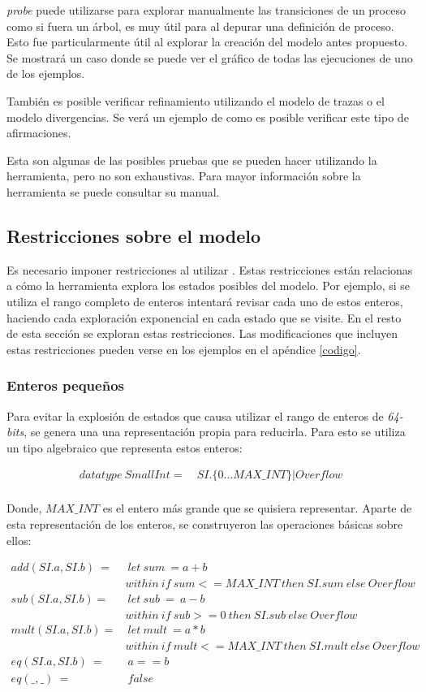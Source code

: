 \textit{probe} puede utilizarse para explorar manualmente las transiciones de un proceso como si fuera un árbol, es muy útil para al depurar una definición de proceso. Esto fue particularmente útil al explorar la creación del modelo antes propuesto. Se mostrará un caso donde se puede ver el gráfico de todas las ejecuciones de uno de los ejemplos. 
 
También es posible verificar refinamiento utilizando el modelo de trazas o el modelo divergencias. Se verá un ejemplo de como es posible verificar este tipo de afirmaciones.

Esta son algunas de las posibles pruebas que se pueden hacer utilizando la herramienta, pero no son exhaustivas. Para mayor información sobre la herramienta se puede consultar su manual\cite{fdrmanual}.

\subsection{Restricciones sobre el modelo}

Es necesario imponer restricciones al utilizar \FDR. Estas restricciones están relacionas a cómo la herramienta explora los estados posibles del modelo. Por ejemplo, si se utiliza el rango completo de enteros intentará revisar cada uno de estos enteros, haciendo cada exploración exponencial en cada estado que se visite. En el resto de esta sección se exploran estas restricciones. Las modificaciones que incluyen estas restricciones pueden verse en los ejemplos en el apéndice \ref{codigo}.

\subsubsection*{Enteros pequeños}

Para evitar la explosión de estados que causa utilizar el rango de enteros de \textit{64-bits}, se genera una una representación propia para reducirla. Para esto se utiliza un tipo algebraico que representa estos enteros:

\begin{align*}
datatype\ SmallInt =&\ SI.\{0 \ldots MAX\_INT\} | Overflow \\
\end{align*}

Donde, $MAX\_INT$ es el entero más grande que se quisiera representar. Aparte de esta representación de los enteros, se construyeron las operaciones básicas sobre ellos:

\begin{align*}
add(SI.a, SI.b)\ =&\ let\ sum\ = a + b \\
&within\ if\ sum <= MAX\_INT\ then\ SI.sum\ else\ Overflow  \\
%
sub(SI.a, SI.b) =&\ let\ sub\ =\ a - b \\
& within\ if\ sub >= 0\ then\ SI.sub\ else\ Overflow \\
%
mult(SI.a, SI.b) =&\ let\ mult\ = a * b \\
& within\ if\ mult <= MAX\_INT\ then\ SI.mult\ else\ Overflow \\
eq(SI.a, SI.b)\ =&\ a == b \\
eq(\_, \_)\ =&\ false
\end{align*}

